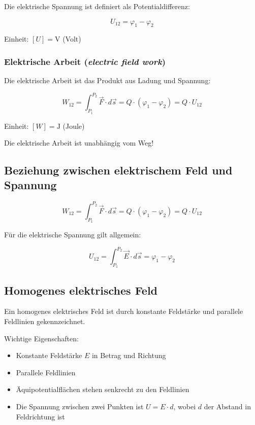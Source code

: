 \documentclass[
  11pt,
]{article}
\providecommand{\tightlist}{%
  \setlength{\itemsep}{0pt}\setlength{\parskip}{0pt}}
\begin{document}
Die elektrische Spannung ist definiert als Potentialdifferenz:

\[U_{12} = \varphi_1 - \varphi_2\]

Einheit: \([U] = \text{V}\) (Volt)

\subsubsection{\texorpdfstring{Elektrische Arbeit (\emph{electric field
work})}{Elektrische Arbeit (electric field work)}}\label{elektrische-arbeit-electric-field-work}

Die elektrische Arbeit ist das Produkt aus Ladung und Spannung:

\[W_{12} = \int_{P_1}^{P_2} \vec{F} \cdot d\vec{s} = Q \cdot (\varphi_1 - \varphi_2) = Q \cdot U_{12}\]

Einheit: \([W] = \text{J}\) (Joule)

Die elektrische Arbeit ist unabhängig vom Weg!

\subsection{Beziehung zwischen elektrischem Feld und
Spannung}\label{beziehung-zwischen-elektrischem-feld-und-spannung}

\[W_{12} = \int_{P_1}^{P_2} \vec{F} \cdot d\vec{s} = Q \cdot (\varphi_1 - \varphi_2) = Q \cdot U_{12}\]

Für die elektrische Spannung gilt allgemein:

\[U_{12} = \int_{P_1}^{P_2} \vec{E} \cdot d\vec{s} = \varphi_1 - \varphi_2\]

\subsection{Homogenes elektrisches
Feld}\label{homogenes-elektrisches-feld}

Ein homogenes elektrisches Feld ist durch konstante Feldstärke und
parallele Feldlinien gekennzeichnet.

Wichtige Eigenschaften:

\begin{itemize}
\tightlist
\item
  Konstante Feldstärke \(E\) in Betrag und Richtung
\item
  Parallele Feldlinien
\item
  Äquipotentialflächen stehen senkrecht zu den Feldlinien
\item
  Die Spannung zwischen zwei Punkten ist \(U = E \cdot d\), wobei \(d\)
  der Abstand in Feldrichtung ist
\end{itemize}
\end{document}
